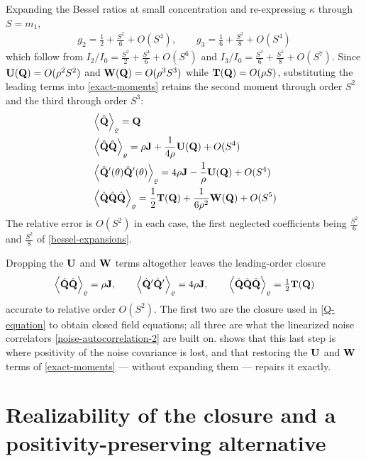\documentclass[a5paper]{article}
\begin{document}
Expanding the Bessel ratios at small concentration and re-expressing $\kappa$ through $S = m_1$,
\begin{align}
    \label{bessel-expansions}
    g_2 = \frac{1}{2} + \frac{S^2}{6} + O(S^4),
    \qquad
    g_3 = \frac{1}{6} + \frac{S^2}{8} + O(S^4)
\end{align}
which follow from $I_2/I_0 = \tfrac{S^2}{2} + \tfrac{S^4}{6} + O(S^6)$ and $I_3/I_0 = \tfrac{S^3}{6} + \tfrac{S^5}{8} + O(S^7)$. Since $\mathbf{U}(\mathbf{Q}) = O(\rho^2S^2)$ and $\mathbf{W}(\mathbf{Q}) = O(\rho^3S^3)$ while $\mathbf{T}(\mathbf{Q}) = O(\rho S)$, substituting the leading terms into \eqref{exact-moments} retains the second moment through order $S^2$ and the third through order $S^3$:
\begin{subequations}
    \label{max-entropy-moments}
\begin{align}
    &\left\langle \hat{\mathbf{Q}} \right\rangle_\varrho = \mathbf{Q}
    \\
    &\left\langle \hat{\mathbf{Q}}\hat{\mathbf{Q}} \right\rangle_\varrho =
    \rho \mathbf{J} + \frac{1}{4\rho} \mathbf{U}(\mathbf{Q}) + O(S^4)
    \\
    &\left\langle \hat{\mathbf{Q}}'(\theta) \hat{\mathbf{Q}}'(\theta) \right\rangle_\varrho =
    4\rho \mathbf{J} - \frac{1}{\rho} \mathbf{U}(\mathbf{Q}) + O(S^4)
    \\
    &\left\langle \hat{\mathbf{Q}}\hat{\mathbf{Q}}\hat{\mathbf{Q}} \right\rangle_\varrho =
    \frac{1}{2}\mathbf{T}(\mathbf{Q}) + \frac{1}{6\rho^2}\mathbf{W}(\mathbf{Q}) + O(S^5)
\end{align}
\end{subequations}
The relative error is $O(S^2)$ in each case, the first neglected coefficients being $\tfrac{S^2}{6}$ and $\tfrac{S^2}{8}$ of \eqref{bessel-expansions}.

Dropping the $\mathbf{U}$ and $\mathbf{W}$ terms altogether leaves the leading-order closure
\begin{align}
    \label{leading-closure}
    \left\langle \hat{\mathbf{Q}}\hat{\mathbf{Q}} \right\rangle_\varrho = \rho\mathbf{J},
    \qquad
    \left\langle \hat{\mathbf{Q}}'\hat{\mathbf{Q}}' \right\rangle_\varrho = 4\rho\mathbf{J},
    \qquad
    \left\langle \hat{\mathbf{Q}}\hat{\mathbf{Q}}\hat{\mathbf{Q}} \right\rangle_\varrho = \tfrac{1}{2}\mathbf{T}(\mathbf{Q})
\end{align}
accurate to relative order $O(S^2)$. The first two are the closure used in \cref{Q-equation} to obtain closed field equations; all three are what the linearized noise correlators \cref{noise-autocorrelation-2} are built on.  shows that this last step is where positivity of the noise covariance is lost, and that restoring the $\mathbf{U}$ and $\mathbf{W}$ terms of \eqref{exact-moments} --- without expanding them --- repairs it exactly.


\section{Realizability of the closure and a positivity-preserving alternative}
\label{sec-realizability}
\end{document}
